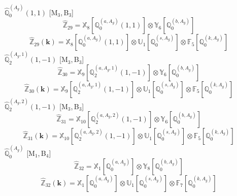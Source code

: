 \documentclass[fleqn,10pt,landscape]{article}
\begin{document}
\begin{itemize}
\vspace{4mm}
\noindent {} $\,\,\,\hat{\mathbb{Q}}_{0}^{(A_{g})}(1,1)$ [M$_{3}$,\,B$_{3}$]
\begin{dmath*}
\hat{\mathbb{Z}}_{29}=\mathbb{X}_{8}[\mathbb{Q}_{0}^{(a,A_{g})}(1,1)] \otimes\mathbb{Y}_{6}[\mathbb{Q}_{0}^{(b,A_{g})}]
\end{dmath*}
\begin{dmath*}
\hat{\mathbb{Z}}_{29}(\bm{k})=\mathbb{X}_{8}[\mathbb{Q}_{0}^{(a,A_{g})}(1,1)] \otimes\mathbb{U}_{1}[\mathbb{Q}_{0}^{(s,A_{g})}] \otimes\mathbb{F}_{5}[\mathbb{Q}_{0}^{(k,A_{g})}]
\end{dmath*}
\vspace{4mm}
\noindent {} $\,\,\,\hat{\mathbb{Q}}_{2}^{(A_{g},1)}(1,-1)$ [M$_{3}$,\,B$_{3}$]
\begin{dmath*}
\hat{\mathbb{Z}}_{30}=\mathbb{X}_{9}[\mathbb{Q}_{2}^{(a,A_{g},1)}(1,-1)] \otimes\mathbb{Y}_{6}[\mathbb{Q}_{0}^{(b,A_{g})}]
\end{dmath*}
\begin{dmath*}
\hat{\mathbb{Z}}_{30}(\bm{k})=\mathbb{X}_{9}[\mathbb{Q}_{2}^{(a,A_{g},1)}(1,-1)] \otimes\mathbb{U}_{1}[\mathbb{Q}_{0}^{(s,A_{g})}] \otimes\mathbb{F}_{5}[\mathbb{Q}_{0}^{(k,A_{g})}]
\end{dmath*}
\vspace{4mm}
\noindent {} $\,\,\,\hat{\mathbb{Q}}_{2}^{(A_{g},2)}(1,-1)$ [M$_{3}$,\,B$_{3}$]
\begin{dmath*}
\hat{\mathbb{Z}}_{31}=\mathbb{X}_{10}[\mathbb{Q}_{2}^{(a,A_{g},2)}(1,-1)] \otimes\mathbb{Y}_{6}[\mathbb{Q}_{0}^{(b,A_{g})}]
\end{dmath*}
\begin{dmath*}
\hat{\mathbb{Z}}_{31}(\bm{k})=\mathbb{X}_{10}[\mathbb{Q}_{2}^{(a,A_{g},2)}(1,-1)] \otimes\mathbb{U}_{1}[\mathbb{Q}_{0}^{(s,A_{g})}] \otimes\mathbb{F}_{5}[\mathbb{Q}_{0}^{(k,A_{g})}]
\end{dmath*}
\vspace{4mm}
\noindent {} $\,\,\,\hat{\mathbb{Q}}_{0}^{(A_{g})}$ [M$_{1}$,\,B$_{4}$]
\begin{dmath*}
\hat{\mathbb{Z}}_{32}=\mathbb{X}_{1}[\mathbb{Q}_{0}^{(a,A_{g})}] \otimes\mathbb{Y}_{8}[\mathbb{Q}_{0}^{(b,A_{g})}]
\end{dmath*}
\begin{dmath*}
\hat{\mathbb{Z}}_{32}(\bm{k})=\mathbb{X}_{1}[\mathbb{Q}_{0}^{(a,A_{g})}] \otimes\mathbb{U}_{1}[\mathbb{Q}_{0}^{(s,A_{g})}] \otimes\mathbb{F}_{7}[\mathbb{Q}_{0}^{(k,A_{g})}]
\end{dmath*}

\end{itemize}
\end{document}
